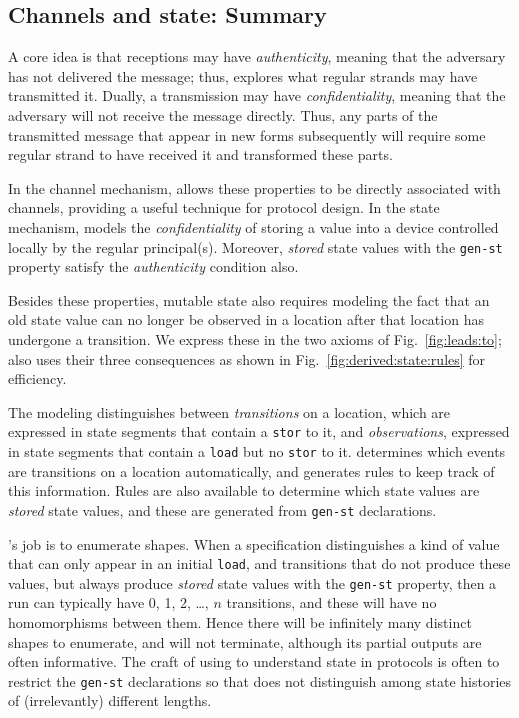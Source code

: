 \subsection{Channels and state:  Summary}
\label{sec:channels:state:summary}

A core idea is that receptions may have \emph{authenticity}, meaning
that the adversary has not delivered the message; thus, {\cpsa}
explores what regular strands may have transmitted it.  Dually, a
transmission may have \emph{confidentiality}, meaning that the
adversary will not receive the message directly.  Thus, any parts of
the transmitted message that appear in new forms subsequently will
require some regular strand to have received it and transformed these
parts.

In the {channel} mechanism, {\cpsa} allows these properties to be
directly associated with channels, providing a useful technique for
protocol design.  In the state mechanism, {\cpsa} models the
\emph{confidentiality} of storing a value into a device controlled
locally by the regular principal(s).  Moreover, \emph{stored} state
values with the \texttt{gen-st} property satisfy the
\emph{authenticity} condition also.

Besides these properties, mutable state also requires modeling the
fact that an old state value can no longer be observed in a location
after that location has undergone a transition.  We express these in
the two axioms of Fig.~\ref{fig:leads:to}; {\cpsa} also uses their
three consequences as shown in Fig.~\ref{fig:derived:state:rules} for
efficiency.

The modeling distinguishes between \emph{transitions} on a location,
which are expressed in state segments that contain a \verb|stor| to
it, and \emph{observations}, expressed in state segments that contain
a \verb|load| but no \verb|stor| to it.  {\cpsa} determines which
events are transitions on a location automatically, and generates
rules to keep track of this information.  Rules are also available to
determine which state values are \emph{stored} state values, and these
are generated from \texttt{gen-st} declarations.

{\cpsa}'s job is to enumerate shapes.  When a specification
distinguishes a kind of value that can only appear in an initial
\verb|load|, and transitions that do not produce these values, but
always produce \emph{stored} state values with the \texttt{gen-st}
property, then a run can typically have 0, 1, 2, \dots, $n$
transitions, and these will have no homomorphisms between them.  Hence
there will be infinitely many distinct shapes to enumerate, and
{\cpsa} will not terminate, although its partial outputs are often
informative.  The craft of using {\cpsa} to understand state in
protocols is often to restrict the \texttt{gen-st} declarations so
that {\cpsa} does not distinguish among state histories of
(irrelevantly) different lengths.

